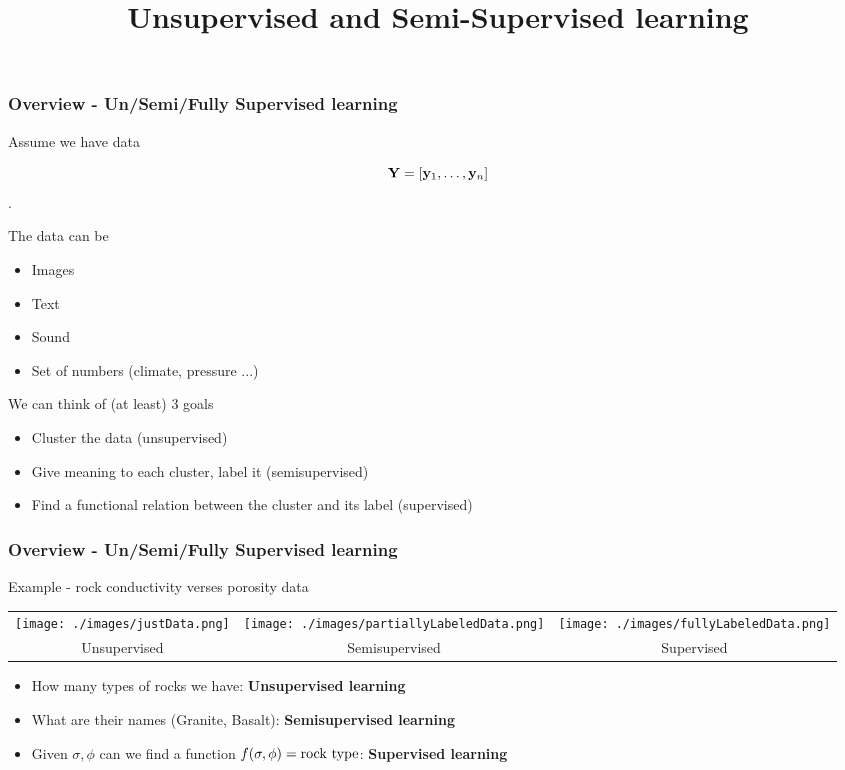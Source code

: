 \documentclass[12pt,fleqn]{beamer}
\title{Unsupervised and Semi-Supervised learning}
\date{}
\begin{document}
\makebeamertitle



\begin{frame}
\frametitle{Overview - Un/Semi/Fully Supervised learning}


Assume we have data 

$${\bf Y} = [{\bf y}_1, \ldots, {\bf y}_n]$$.

The data can be
\begin{itemize}
\item Images
\item Text
\item Sound
\item Set of numbers (climate, pressure ...)
\end{itemize}

\bigskip

We can think of (at least) 3 goals
\begin{itemize}
\item Cluster the data (unsupervised)
\item Give meaning to each cluster, label it (semisupervised)
\item Find a functional relation between the cluster and its label (supervised)
\end{itemize}

\end{frame}

\begin{frame}
\frametitle{Overview - Un/Semi/Fully Supervised learning}

Example - rock conductivity verses porosity data
\begin{center}
\begin{tabular}{ccc}
\texttt{[image: ./images/justData.png]} &
\texttt{[image: ./images/partiallyLabeledData.png]} &
\texttt{[image: ./images/fullyLabeledData.png]} \\
Unsupervised & Semisupervised & Supervised
\end{tabular}
\end{center}

\begin{itemize}
\item How many types of rocks we have: {\bf Unsupervised learning}
\item What are their names (Granite, Basalt): {\bf Semisupervised learning}
\item Given $\sigma, \phi$ can we find a function $f(\sigma,\phi) = {\rm rock\ type}$: {\bf Supervised learning}
\end{itemize}


\end{frame}
\end{document}
